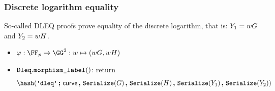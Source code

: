 \documentclass[11pt]{article}
\begin{document}

\subsubsection{Discrete logarithm equality}
So-called DLEQ proofs prove equality of the discrete logarithm, that is: $Y_1 = wG$ and $Y_2 = wH$.

\begin{itemize}
  \item $\varphi:\FF_p\to\GG^2:w\mapsto (wG,wH)$
  \item $\texttt{Dleq}.\texttt{morphism\_label}()$: return
  \[
    \hash(\dleqlabel \concatblock \curvectx \concat \serialize(G) \concat \serialize(H) \concat \serialize(\statement_1) \concat \serialize(\statement_2))
  \]
\end{itemize}
\end{document}
